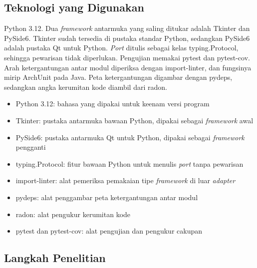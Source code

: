 \documentclass[11pt,a4paper]{article}
\begin{document}
\subsection{Teknologi yang Digunakan}

Python 3.12. Dua \textit{framework} antarmuka yang saling ditukar adalah Tkinter dan PySide6. Tkinter sudah tersedia di pustaka standar Python, sedangkan PySide6 adalah pustaka Qt untuk Python. \textit{Port} ditulis sebagai kelas typing.Protocol, sehingga pewarisan tidak diperlukan. Pengujian memakai pytest dan pytest-cov. Arah ketergantungan antar modul diperiksa dengan import-linter, dan fungsinya mirip ArchUnit pada Java. Peta ketergantungan digambar dengan pydeps, sedangkan angka kerumitan kode diambil dari radon.

\begin{itemize}[leftmargin=*]
  \item Python 3.12: bahasa yang dipakai untuk keenam versi program
  \item Tkinter: pustaka antarmuka bawaan Python, dipakai sebagai \textit{framework} awal
  \item PySide6: pustaka antarmuka Qt untuk Python, dipakai sebagai \textit{framework} pengganti
  \item typing.Protocol: fitur bawaan Python untuk menulis \textit{port} tanpa pewarisan
  \item import-linter: alat pemeriksa pemakaian tipe \textit{framework} di luar \textit{adapter}
  \item pydeps: alat penggambar peta ketergantungan antar modul
  \item radon: alat pengukur kerumitan kode
  \item pytest dan pytest-cov: alat pengujian dan pengukur cakupan
\end{itemize}

\subsection{Langkah Penelitian}
\end{document}
